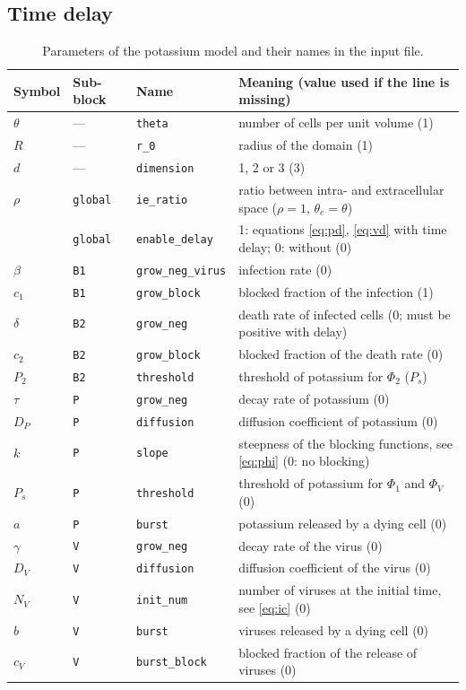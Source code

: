 \documentclass[11pt]{article}
\newcommand{\code}[1]{\texttt{#1}}
\newcommand{\thetae}{\theta_e}
\begin{document}
\subsection{Time delay}
\label{sec:delay}
\begin{table}[t]
\centering
\small
\begin{tabular}{@{}llll@{}}
\toprule
Symbol & Sub-block & Name & Meaning (value used if the line is missing) \\
\midrule
$\theta$ & --- & \code{theta} & number of cells per unit volume (1) \\
$R$ & --- & \code{r\_0} & radius of the domain (1) \\
$d$ & --- & \code{dimension} & 1, 2 or 3 (3) \\
\midrule
$\rho$ & \code{global} & \code{ie\_ratio} & ratio between intra- and extracellular space ($\rho=1$, $\thetae=\theta$) \\
       & \code{global} & \code{enable\_delay} & 1: equations \eqref{eq:pd}, \eqref{eq:vd} with time delay; 0: without (0) \\
\midrule
$\beta$ & \code{B1} & \code{grow\_neg\_virus} & infection rate (0) \\
$c_1$ & \code{B1} & \code{grow\_block} & blocked fraction of the infection (1) \\
$\delta$ & \code{B2} & \code{grow\_neg} & death rate of infected cells (0; must be positive with delay) \\
$c_2$ & \code{B2} & \code{grow\_block} & blocked fraction of the death rate (0) \\
$P_2$ & \code{B2} & \code{threshold} & threshold of potassium for $\Phi_2$ ($P_s$) \\
\midrule
$\tau$ & \code{P} & \code{grow\_neg} & decay rate of potassium (0) \\
$D_P$ & \code{P} & \code{diffusion} & diffusion coefficient of potassium (0) \\
$k$ & \code{P} & \code{slope} & steepness of the blocking functions, see \eqref{eq:phi} (0: no blocking) \\
$P_s$ & \code{P} & \code{threshold} & threshold of potassium for $\Phi_1$ and $\Phi_V$ (0) \\
$a$ & \code{P} & \code{burst} & potassium released by a dying cell (0) \\
\midrule
$\gamma$ & \code{V} & \code{grow\_neg} & decay rate of the virus (0) \\
$D_V$ & \code{V} & \code{diffusion} & diffusion coefficient of the virus (0) \\
$N_V$ & \code{V} & \code{init\_num} & number of viruses at the initial time, see \eqref{eq:ic} (0) \\
$b$ & \code{V} & \code{burst} & viruses released by a dying cell (0) \\
$c_V$ & \code{V} & \code{burst\_block} & blocked fraction of the release of viruses (0) \\
\bottomrule
\end{tabular}
\caption{Parameters of the potassium model and their names in the input file.}
\label{tab:par}
\end{table}
\end{document}
